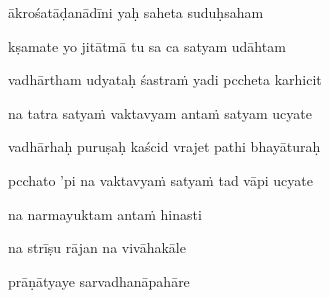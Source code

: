 ākrośatāḍanādīni yaḥ saheta suduḥsaham\thinspace{\dandab} \dontdisplaylinenum

kṣamate yo jitātmā tu sa ca satyam udāhtam \veg\dontdisplaylinenum

vadhārtham udyataḥ śastraṁ yadi pccheta karhicit\thinspace{\dandab} \dontdisplaylinenum

na tatra satyaṁ vaktavyam antaṁ satyam ucyate \veg\dontdisplaylinenum
{}

vadhārhaḥ puruṣaḥ kaścid vrajet pathi bhayāturaḥ\thinspace{\dandab} \dontdisplaylinenum

pcchato 'pi na vaktavyaṁ satyaṁ tad vāpi ucyate \veg\dontdisplaylinenum
{}

\ujvers\nemsloka 
na narmayuktam antaṁ hinasti
\dontdisplaylinenum

\nemslokab 
na strīṣu rājan na vivāhakāle \danda\dontdisplaylinenum

\nemslokac 
prāṇātyaye sarvadhanāpahāre
\dontdisplaylinenum

